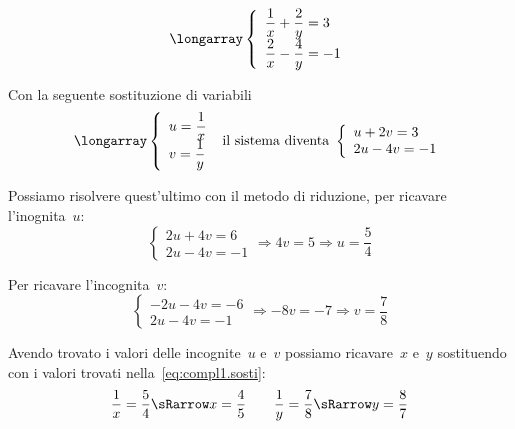  \begin{esempio}
\[\longarray\left\{\begin{array}{l}
  \dfrac{1}{x}+\dfrac{2}{y}=3\\
  \dfrac{2}{x}-\dfrac{4}{y}=-1 
\end{array}\right.\]

 
Con la seguente sostituzione di variabili
\label{eq:compl1.sosti}
\[\longarray\left\{\begin{array}{l}
  u=\dfrac{1}{x}\\
  v=\dfrac{1}{y}
\end{array}\right.
 \text{ il sistema diventa }
\left\{\begin{array}{l}
  u+2v=3 \\
  2u-4v=-1 
\end{array}\right.\]


Possiamo risolvere quest'ultimo con il metodo di riduzione, 
per ricavare l'inognita~\(u\):
\[\left\{\begin{array}{l}
2u+4v=6 \\
2u-4v=-1
\end{array}\right. \Rightarrow 4v=5 \Rightarrow u=\frac{5}{4}\]

Per ricavare l'incognita~\(v\):
\[\left\{\begin{array}{l}
-2u-4v=-6 \\
2u-4v=-1 \end{array}\right. \Rightarrow -8v=-7 \Rightarrow v=\frac{7}{8}\]

Avendo trovato i valori delle incognite~\(u\) e~\(v\) possiamo ricavare~\(x\) 
e~\(y\) sostituendo con i valori trovati nella~\ref{eq:compl1.sosti}:
\[\dfrac{1}{x}=\dfrac{5}{4} \sRarrow x=\dfrac{4}{5} \qquad
  \dfrac{1}{y}=\dfrac{7}{8} \sRarrow y=\dfrac{8}{7}\]
 \end{esempio}

